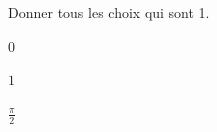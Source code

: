 \documentclass[12pt]{exam}
\begin{document}
\begin{questions}
\vspace{1em}





\question Donner tous les choix qui sont 1.



\begin{choices}

  
    \choice $0$
  

  
    \CorrectChoice $1$
  

  
    \choice $\tfrac{\pi}{2}$
  

\end{choices}









\vspace{1em}



\end{questions}
\end{document}
